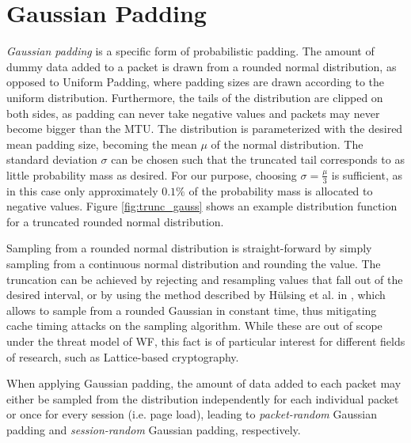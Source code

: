 \documentclass[
	ruledheaders=chapter,
	class=report,
	thesis={type=master, department=inf},
	accentcolor=1c,
	custommargins=true,
	marginpar=false,
	parskip=half-,
	fontsize=11pt,
]{tudapub}
\begin{document}
	\section{Gaussian Padding}
	\label{gaussian_padding}
	
	\textit{Gaussian padding} is a specific form of probabilistic padding. The amount of dummy data added to a packet is drawn from a rounded normal distribution, as opposed to Uniform Padding, where padding sizes are drawn according to the uniform distribution. Furthermore, the tails of the distribution are clipped on both sides, as padding can never take negative values and packets may never become bigger than the MTU. The distribution is parameterized with the desired mean padding size, becoming the mean $\mu$ of the normal distribution. The standard deviation $\sigma$ can be chosen such that the truncated tail corresponds to as little probability mass as desired. For our purpose, choosing $\sigma = \frac{\mu}{3}$ is sufficient, as in this case only approximately $0.1\%$ of the probability mass is allocated to negative values. Figure \ref{fig:trunc_gauss} shows an example distribution function for a truncated rounded normal distribution.
	
	Sampling from a rounded normal distribution is straight-forward by simply sampling from a continuous normal distribution and rounding the value. The truncation can be achieved by rejecting and resampling values that fall out of the desired interval, or by using the method described by Hülsing et al. in \cite{Huelsing2018}, which allows to sample from a rounded Gaussian in constant time, thus mitigating cache timing attacks on the sampling algorithm. While these are out of scope under the threat model of WF, this fact is of particular interest for different fields of research, such as Lattice-based cryptography. \cite{Huelsing2018}
	
	When applying Gaussian padding, the amount of data added to each packet may either be sampled from the distribution independently for each individual packet or once for every session (i.e. page load), leading to \textit{packet-random} Gaussian padding and \textit{session-random} Gaussian padding, respectively.
	
\end{document}
